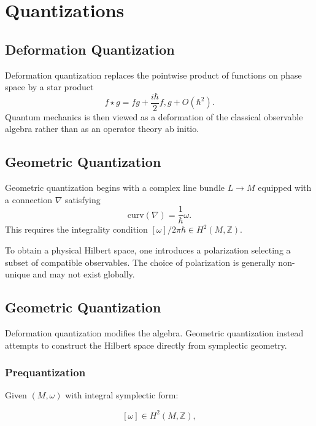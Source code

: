 \chapter{Quantizations }
\label{qnt}

\section{Deformation Quantization}

Deformation quantization replaces the pointwise product of functions on phase space by a star product
\begin{equation}
f \star g = fg + \frac{i\hbar}{2}{f,g} + O(\hbar^2).
\end{equation}
Quantum mechanics is then viewed as a deformation of the classical observable algebra rather than as an operator theory ab initio.

\section{Geometric Quantization}

Geometric quantization begins with a complex line bundle $L \to M$ equipped with a connection $\nabla$ satisfying
\begin{equation}
\mathrm{curv}(\nabla) = \frac{1}{\hbar}\omega.
\end{equation}
This requires the integrality condition $[\omega]/2\pi\hbar \in H^2(M,\mathbb{Z})$.

To obtain a physical Hilbert space, one introduces a polarization selecting a subset of compatible observables. The choice of polarization is generally non-unique and may not exist globally.

\section{Geometric Quantization}

Deformation quantization modifies the algebra. 
Geometric quantization instead attempts to construct the Hilbert space 
directly from symplectic geometry.

\subsection{Prequantization}

Given $(M,\omega)$ with integral symplectic form:

\[
[\omega] \in H^2(M,\mathbb Z),
\]

